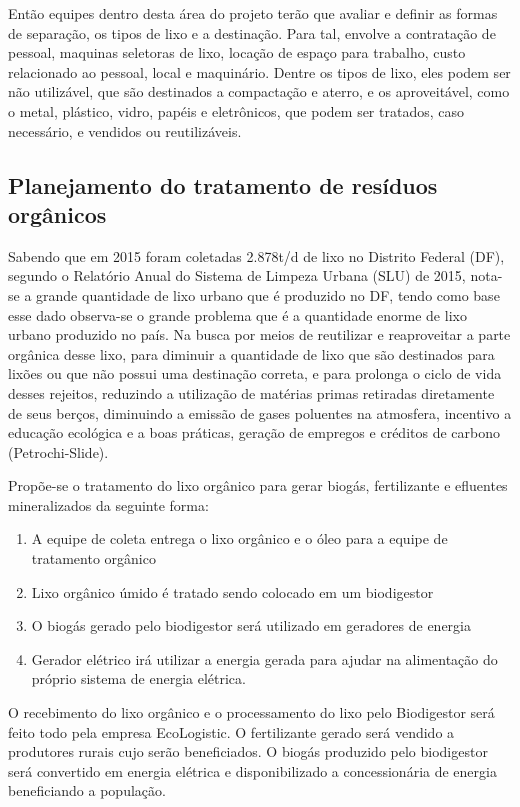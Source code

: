     Então equipes dentro desta área do projeto terão que avaliar e definir as formas de
    separação, os tipos de lixo e a destinação. Para tal, envolve a contratação de pessoal, maquinas seletoras de lixo,
    locação de espaço para trabalho, custo relacionado ao pessoal, local e maquinário.
    Dentre os tipos de lixo, eles podem ser não utilizável, que são destinados a compactação e aterro,
    e os aproveitável, como o metal, plástico, vidro, papéis e eletrônicos, que podem ser tratados, caso
    necessário, e vendidos ou reutilizáveis.

  \subsection{Planejamento do tratamento de resíduos orgânicos}

  Sabendo que em 2015 foram coletadas 2.878t/d de lixo no Distrito Federal (DF), segundo o Relatório Anual do Sistema de Limpeza Urbana (SLU) de 2015, nota-se a grande quantidade de lixo urbano que é produzido no DF, tendo como base esse dado observa-se o grande problema que é a quantidade enorme de lixo urbano produzido no país. Na busca por meios de reutilizar e reaproveitar a parte orgânica desse lixo, para diminuir a quantidade de lixo que são destinados para lixões ou que não possui uma destinação correta, e para prolonga o ciclo de vida desses rejeitos, reduzindo a utilização de matérias primas retiradas diretamente de seus berços, diminuindo a emissão de gases poluentes na atmosfera, incentivo a educação ecológica e a boas práticas, geração de empregos e créditos de carbono (Petrochi-Slide).

  Propõe-se o tratamento do lixo orgânico para gerar biogás, fertilizante e efluentes mineralizados da seguinte forma:
  \begin{enumerate}
    \item A equipe de coleta entrega o lixo orgânico e o óleo para a equipe de tratamento orgânico
    \item Lixo orgânico úmido é tratado sendo colocado em um biodigestor
    \item O biogás gerado pelo biodigestor será utilizado em geradores de energia
    \item Gerador elétrico irá utilizar a energia gerada para ajudar na alimentação do próprio sistema de energia elétrica.
  \end{enumerate}

  O recebimento do lixo orgânico e o processamento do lixo pelo Biodigestor será feito todo pela empresa EcoLogistic. O fertilizante gerado será vendido a produtores rurais cujo serão beneficiados. O biogás produzido pelo biodigestor será convertido em energia elétrica e disponibilizado a concessionária de energia beneficiando a população.
